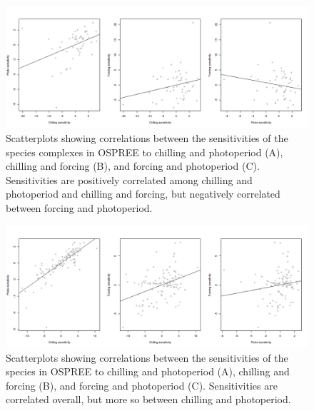 \documentclass{article}\usepackage[]{graphicx}\usepackage[]{color}
\begin{document}
\clearpage
\begin{figure} [H]
  \begin{center}
  \includegraphics[width=14cm]{..//..//analyses/phylogeny/figures/correlations_sensitiv_52complex.png}
  \caption{Scatterplots showing correlations between the sensitivities of the species complexes in OSPREE to chilling and photoperiod (A), chilling and forcing (B), and forcing and photoperiod (C). Sensitivities are positively correlated among chilling and photoperiod and chilling and forcing, but negatively correlated between forcing and photoperiod.}
  \label{fig:sensicorrs}
  \end{center}
\end{figure}

\clearpage
\begin{figure} [H]
  \begin{center}
  \includegraphics[width=14cm]{..//..//analyses/phylogeny/figures/Correlations_sensitivities.png}
  \caption{Scatterplots showing correlations between the sensitivities of the species in OSPREE to chilling and photoperiod (A), chilling and forcing (B), and forcing and photoperiod (C). Sensitivities are  correlated overall, but more so between chilling and photoperiod.}
  \label{fig:sensicorrs52comp}
  \end{center}
\end{figure}
\end{document}
